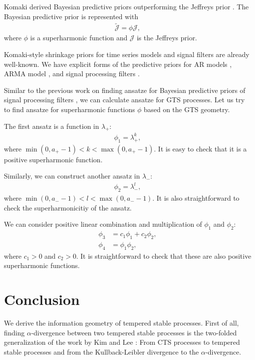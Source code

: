 \documentclass[preprint,11pt]{amsart}
\begin{document}
	Komaki derived Bayesian predictive priors outperforming the Jeffreys prior \cite{komaki2006shrinkage}. The Bayesian predictive prior is represented with
	\begin{align}
		\tilde{\mathcal{J}}=\phi \mathcal{J},
	\end{align}
	where $\phi$ is a superharmonic function and $\mathcal{J}$ is the Jeffreys prior.
	
	Komaki-style shrinkage priors for time series models and signal filters are already well-known. We have explicit forms of the predictive priors for AR models \cite{komaki2006shrinkage,tanaka2018superharmonic}, ARMA model \cite{choi2015kahlerian, choi2015geometric, oda2021shrinkage}, and signal processing filters \cite{choi2015geometric}.
	
	Similar to the previous work on finding ansatze for Bayesian predictive priors of signal processing filters \cite{choi2015geometric}, we can calculate ansatze for GTS processes. Let us try to find ansatze for superharmonic functions $\phi$ based on the GTS geometry. 
	
	The first ansatz is a function in $\lambda_+$:
	\begin{align}
		\phi_1=\lambda_+^k,
	\end{align}
	where $\min(0,a_+-1)<k<\max(0,a_+-1)$. It is easy to check that it is a positive superharmonic function.

	Similarly, we can construct another ansatz in $\lambda_-$:	
	\begin{align}
		\phi_2=\lambda_-^l,
	\end{align}
	where $\min(0,a_--1)<l<\max(0,a_--1)$. It is also straightforward to check the superharmonicitiy of the ansatz.
	
	We can consider positive linear combination and multiplication of $\phi_1$ and $\phi_2$:
	\begin{align}
		\phi_3&= c_1\phi_1+c_2\phi_2,\\
		\phi_4&= \phi_1\phi_2,
	\end{align}
	where $c_1>0$ and $c_2>0$. It is straightforward to check that these are also positive superharmonic functions.
		
\section{Conclusion}
	We derive the information geometry of tempered stable processes. First of all, finding $\alpha$-divergence between two tempered stable processes is the two-folded generalization of the work by Kim and Lee \cite{kim2007relative}: From CTS processes to tempered stable processes and from the Kullback-Leibler divergence to the $\alpha$-divergence. 
	
\end{document}
